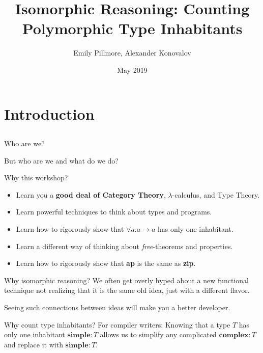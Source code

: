 \documentclass[tikz]{beamer}
\title{Isomorphic Reasoning: Counting Polymorphic Type Inhabitants}
\author{Emily Pillmore, Alexander Konovalov}
\date{May 2019}
\theoremstyle{definition}
\begin{document}
\maketitle

\section{Introduction}
\subsection{}

\begin{frame}{Who are we?}

But who are we and what do we do?

\end{frame}

\begin{frame}{Why this workshop?}
\begin{itemize}
    \item Learn you a \textbf{good deal of Category Theory}, $\lambda$-calculus, and Type Theory.
    \item Learn powerful techniques to think about types and programs.
    \item Learn how to rigorously show that $\forall a. a \rightarrow a$ has only one inhabitant.
    \item Learn a different way of thinking about \textit{free}-theorems and properties.
    \item Learn how to rigorously show that \textbf{ap} is the same as \textbf{zip}.
\end{itemize}
\end{frame}

\begin{frame}{Why isomorphic reasoning?}
We often get overly hyped about a new functional technique not realizing that it is the same old idea, just with a different flavor.

Seeing such connections between ideas will make you a better developer.
\end{frame}

\begin{frame}{Why count type inhabitants?}
For compiler writers: Knowing that a type $T$ has only one inhabitant $\textbf{simple} : T$ allows us to simplify any complicated $\textbf{complex} : T$ and replace it with $\textbf{simple} : T$.
\end{frame}
\end{document}
